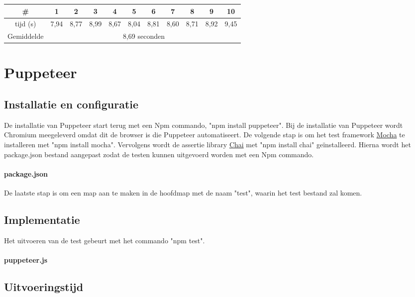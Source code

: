 \begin{tabular}{ |c| |c |c |c |c |c |c |c |c |c |c| }
\hline
	\# & 1 & 2 & 3 & 4 & 5 & 6 & 7 & 8 & 9 & 10\\
\hline
	tijd (s) & 7,94 & 8,77 & 8,99 & 8,67 & 8,04 & 8,81 & 8,60 & 8,71 & 8,92 & 9,45\\
\hline
 Gemiddelde & \multicolumn{10}{c|}{8,69 seconden}\\
\hline
\end{tabular}

\clearpage
\section{Puppeteer}
\subsection{Installatie en configuratie}
De installatie van Puppeteer start terug met een Npm commando, "npm install puppeteer". Bij de installatie van Puppeteer wordt Chromium meegeleverd omdat dit de browser is die Puppeteer automatiseert. De volgende stap is om het test \gls{framework} \hyperref[mocha]{Mocha} te installeren met "npm install mocha". Vervolgens wordt de \gls{assertie} \gls{library} \hyperref[chai]{Chai} met "npm install chai" geïnstalleerd. Hierna wordt het package.json bestand aangepast zodat de testen kunnen uitgevoerd worden met een Npm commando.

\paragraph{package.json}


De laatste stap is om een map aan te maken in de hoofdmap met de naam "test", waarin het test bestand zal komen.

\clearpage
\subsection{Implementatie}
Het uitvoeren van de test gebeurt met het commando "npm test".

\paragraph{puppeteer.js}

\clearpage
\subsection{Uitvoeringstijd}

